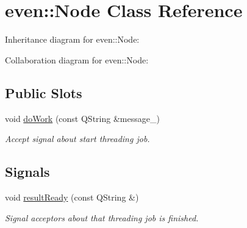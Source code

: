 \hypertarget{classeven_1_1_node}{}\section{even\+:\+:Node Class Reference}
\label{classeven_1_1_node}


Inheritance diagram for even\+:\+:Node\+:


Collaboration diagram for even\+:\+:Node\+:
\subsection*{Public Slots}
\begin{DoxyCompactItemize}
\item 
\mbox{\label{classeven_1_1_node_a461550f1dec776a9743c3c097bae0dd1}} 
void \mbox{\hyperlink{classeven_1_1_node_a461550f1dec776a9743c3c097bae0dd1}{do\+Work}} (const Q\+String \&message\+\_\+)
\begin{DoxyCompactList}\small\item\em Accept signal about start threading job. \end{DoxyCompactList}\end{DoxyCompactItemize}
\subsection*{Signals}
\begin{DoxyCompactItemize}
\item 
\mbox{\label{classeven_1_1_node_a73bcdef34de6f761ae8149891766ec77}} 
void \mbox{\hyperlink{classeven_1_1_node_a73bcdef34de6f761ae8149891766ec77}{result\+Ready}} (const Q\+String \&)
\begin{DoxyCompactList}\small\item\em Signal acceptors about that threading job is finished. \end{DoxyCompactList}\end{DoxyCompactItemize}
